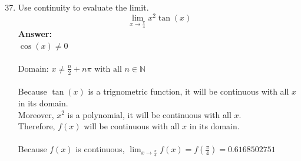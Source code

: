 \documentclass[12pt]{article}
\begin{document}
\begin{enumerate}
    \setcounter{enumi}{36}
        \item Use continuity to evaluate the limit.
        \[ {\displaystyle \lim_{x \to \frac{\pi}{4}} x^2\tan(x)}\]
        \textbf{Answer: }\\
        $\cos(x) \neq 0$\\~\\
        Domain: ${\displaystyle x \neq \frac{n}{2} + n\pi \text{ with all } n \in \mathds{N}}$\\~\\
        Because $\tan(x)$ is a trignometric function, it will be continuous with all $x$ in its domain.\\
        Moreover, $x^2$ is a polynomial, it will be continuous with all $x$.\\
        Therefore, $f(x)$ will be continuous with all $x$ in its domain.\\~\\
        Because $f(x)$ is continuous, $\boxed{{\displaystyle \lim_{x \to \frac{\pi}{4}} f(x) = f(\frac{\pi}{4}) = 0.6168502751 }}$
    \end{enumerate}
\end{document}
